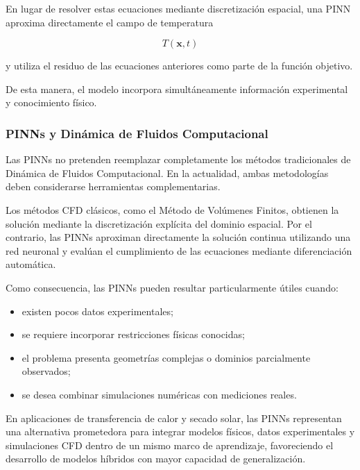 En lugar de resolver estas ecuaciones mediante discretización espacial, una PINN aproxima directamente el campo de temperatura

\[
T(\mathbf{x},t)
\]

y utiliza el residuo de las ecuaciones anteriores como parte de la función objetivo.

De esta manera, el modelo incorpora simultáneamente información experimental y conocimiento físico.

\subsubsection{PINNs y Dinámica de Fluidos Computacional}

Las PINNs no pretenden reemplazar completamente los métodos tradicionales de Dinámica de Fluidos Computacional. En la actualidad, ambas metodologías deben considerarse herramientas complementarias.

Los métodos CFD clásicos, como el Método de Volúmenes Finitos, obtienen la solución mediante la discretización explícita del dominio espacial. Por el contrario, las PINNs aproximan directamente la solución continua utilizando una red neuronal y evalúan el cumplimiento de las ecuaciones mediante diferenciación automática.

Como consecuencia, las PINNs pueden resultar particularmente útiles cuando:

\begin{itemize}

\item existen pocos datos experimentales;

\item se requiere incorporar restricciones físicas conocidas;

\item el problema presenta geometrías complejas o dominios parcialmente observados;

\item se desea combinar simulaciones numéricas con mediciones reales.

\end{itemize}

En aplicaciones de transferencia de calor y secado solar, las PINNs representan una alternativa prometedora para integrar modelos físicos, datos experimentales y simulaciones CFD dentro de un mismo marco de aprendizaje, favoreciendo el desarrollo de modelos híbridos con mayor capacidad de generalización.





